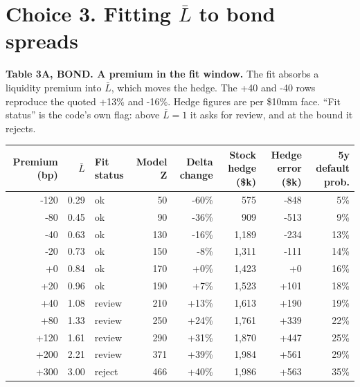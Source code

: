 \documentclass[10pt,a4paper]{article}
\begin{document}
\section*{Choice 3. Fitting $\bar L$ to bond spreads}
\textbf{Table 3A, BOND. A premium in the fit window.} The fit absorbs a liquidity premium into $\bar L$, which moves the hedge. The +40 and -40 rows reproduce the quoted +13\% and -16\%. Hedge figures are per \$10mm face. ``Fit status'' is the code's own flag: above $\bar L = 1$ it asks for review, and at the bound it rejects.
{\small
\begin{center}\begin{tabular}{rrlrrrrr}\toprule
Premium (bp) & $\bar L$ & Fit status & Model Z & Delta change & Stock hedge (\$k) & Hedge error (\$k) & 5y default prob. \\ \midrule
-120 & 0.29 & ok & 50 & -60\% & 575 & -848 & 5\% \\
-80 & 0.45 & ok & 90 & -36\% & 909 & -513 & 9\% \\
-40 & 0.63 & ok & 130 & -16\% & 1,189 & -234 & 13\% \\
-20 & 0.73 & ok & 150 & -8\% & 1,311 & -111 & 14\% \\
+0 & 0.84 & ok & 170 & +0\% & 1,423 & +0 & 16\% \\
+20 & 0.96 & ok & 190 & +7\% & 1,523 & +101 & 18\% \\
+40 & 1.08 & review & 210 & +13\% & 1,613 & +190 & 19\% \\
+80 & 1.33 & review & 250 & +24\% & 1,761 & +339 & 22\% \\
+120 & 1.61 & review & 290 & +31\% & 1,870 & +447 & 25\% \\
+200 & 2.21 & review & 371 & +39\% & 1,984 & +561 & 29\% \\
+300 & 3.00 & reject & 466 & +40\% & 1,986 & +563 & 35\% \\
\bottomrule\end{tabular}\end{center}}
\end{document}
